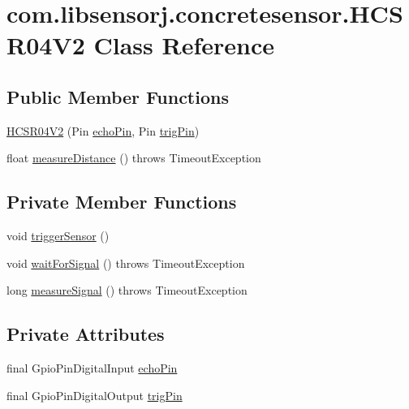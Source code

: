 \hypertarget{classcom_1_1libsensorj_1_1concretesensor_1_1HCSR04V2}{}\section{com.\+libsensorj.\+concretesensor.\+H\+C\+S\+R04\+V2 Class Reference}
\label{classcom_1_1libsensorj_1_1concretesensor_1_1HCSR04V2}
\subsection*{Public Member Functions}
\begin{DoxyCompactItemize}
\item 
\hyperlink{classcom_1_1libsensorj_1_1concretesensor_1_1HCSR04V2_a86f68a051b00b2ec77ce45292a25a0e4}{H\+C\+S\+R04\+V2} (Pin \hyperlink{classcom_1_1libsensorj_1_1concretesensor_1_1HCSR04V2_a487ee7e6b30c5bdecbeaa51d5c3ee2ec}{echo\+Pin}, Pin \hyperlink{classcom_1_1libsensorj_1_1concretesensor_1_1HCSR04V2_af997fea7e3e027fdb73884169208104d}{trig\+Pin})
\item 
float \hyperlink{classcom_1_1libsensorj_1_1concretesensor_1_1HCSR04V2_a44434a5a11a2db761e4c1bbb24972278}{measure\+Distance} ()  throws Timeout\+Exception 
\end{DoxyCompactItemize}
\subsection*{Private Member Functions}
\begin{DoxyCompactItemize}
\item 
void \hyperlink{classcom_1_1libsensorj_1_1concretesensor_1_1HCSR04V2_a0df07b24011800e10088f8ab46785b4e}{trigger\+Sensor} ()
\item 
void \hyperlink{classcom_1_1libsensorj_1_1concretesensor_1_1HCSR04V2_a1c5a84c94eff4a668ba88619f2f4575a}{wait\+For\+Signal} ()  throws Timeout\+Exception 
\item 
long \hyperlink{classcom_1_1libsensorj_1_1concretesensor_1_1HCSR04V2_afb11bfa1d6f176a9ffed01f15cd054e1}{measure\+Signal} ()  throws Timeout\+Exception 
\end{DoxyCompactItemize}
\subsection*{Private Attributes}
\begin{DoxyCompactItemize}
\item 
final Gpio\+Pin\+Digital\+Input \hyperlink{classcom_1_1libsensorj_1_1concretesensor_1_1HCSR04V2_a487ee7e6b30c5bdecbeaa51d5c3ee2ec}{echo\+Pin}
\item 
final Gpio\+Pin\+Digital\+Output \hyperlink{classcom_1_1libsensorj_1_1concretesensor_1_1HCSR04V2_af997fea7e3e027fdb73884169208104d}{trig\+Pin}
\end{DoxyCompactItemize}
